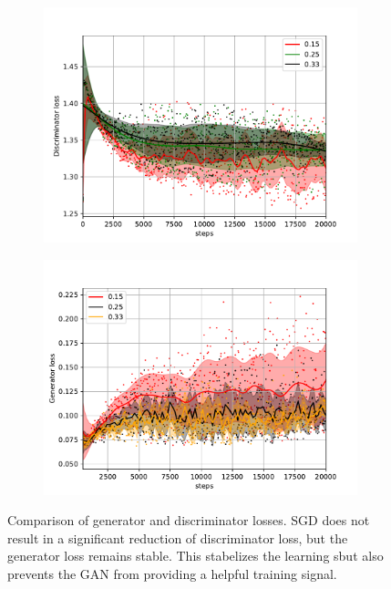 \documentclass[aps,prl,twocolumn,groupedaddress,amsmath,amssymb]{revtex4-1}
\begin{document}
    \begin{figure}[tbp]
        \begin{center}
        \begin{subfigure}[c]{\linewidth}
        \includegraphics[width=\linewidth]{figures/dloss_sgd_adam.pdf}
        \label{Discriminator loss}
        \end{subfigure}
        \begin{subfigure}[c]{\linewidth}
        \includegraphics[width=\linewidth]{figures/gloss_sgd_adam.pdf}
        \label{Generator loss (logarithmic scale)}
        \end{subfigure}
        \end{center}
        \caption{Comparison of generator and discriminator losses. SGD does not result in a significant
        reduction of discriminator loss, but the generator loss remains stable. This stabelizes the
        learning sbut also prevents the GAN from
        providing a helpful training signal.}
        \label{fig:gdloss}
    \end{figure}
\end{document}
